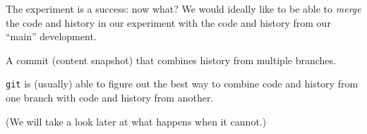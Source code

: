 \documentclass{beamer}
\theoremstyle{example}
\begin{document}
\begin{frame}{The experiment is a success: now what?}
    We would ideally like to be able to \emph{merge} the code and history in our
    experiment with the code and history from our ``main'' development.

    \begin{definition}
        A commit (content snapshot) that combines history from multiple
        branches.
    \end{definition}

    \texttt{git} is (usually) able to figure out the best way to combine code
    and history from one branch with code and history from another.

    (We will take a look later at what happens when it cannot.)
\end{frame}
\end{document}
